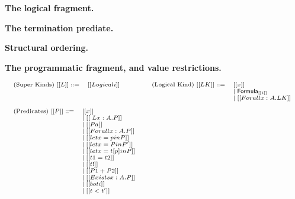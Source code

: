 \textbf{The logical fragment.}

\textbf{The termination prediate.}

\textbf{Structural ordering.}

\textbf{The programmatic fragment, and value restrictions.}

\begin{center}  
  \begin{math}
    \scriptsize
    \begin{array}{llllllllllllllll}      
      \begin{array}{lll}
      \text{(Super Kinds) } [[L]] ::= & [[Logical i]]\\
      & \\
      & \\
    \end{array}
    &
    \begin{array}{lllllll}           
      \text{(Logical Kind) } [[LK]] ::= 
      & [[x]] \\
      & \mid \mathsf{Formula}_{[[i]]} \\
      & \mid [[Forall x : A.LK]]\\
    \end{array}\\
    & \\
      \begin{array}{llllll}
        \text{(Predicates) } [[P]] ::= 
        & [[x]] \\
        & \mid [[\ L x : A . P]] \\
        & \mid [[P a]] \\
        & \mid [[Forall x : A . P]] \\
        & \mid [[let x = p in P]] \\
        & \mid [[let x = P in P']] \\
        & \mid [[let x = t [ p ] in P]] \\
        & \mid [[t1 = t2]] \\
        & \mid [[t !]] \\
        & \mid [[P1 + P2]] \\
        & \mid [[Exists x : A . P]] \\
        & \mid [[bot i]] \\
        & \mid [[t < t']] \\
        & \\
        & \\
        & \\
        & \\
        & \\

\end{array}
\end{array}
\end{math}
\end{center}
